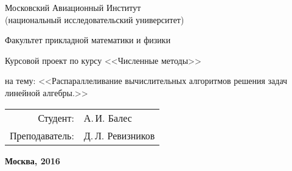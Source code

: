 \begin{titlepage}
\begin{center} %

\bfseries

	{\Large Московский Авиационный Институт \\
	(национальный исследовательский университет)
	
	} %

\vspace{48pt}


	{\large Факультет прикладной математики и физики
	
	}




\vspace{48pt}

	 Курсовой проект по курсу <<Численные методы>>

\vspace{12pt}

	на тему: {\Large <<Распараллеливание вычислительных алгоритмов решения задач линейной алгебры.>> 
	}

\end{center} %

\vspace{60pt}

	\begin{flushright}
		\begin{tabular}{rl}
			Студент: & А.\,И. Балес \\
			Преподаватель: & Д.\,Л. Ревизников \\
		\end{tabular}
	\end{flushright}

\vfill

	\begin{center} %
		\bfseries
		Москва, 2016
	\end{center}
	
\end{titlepage} 